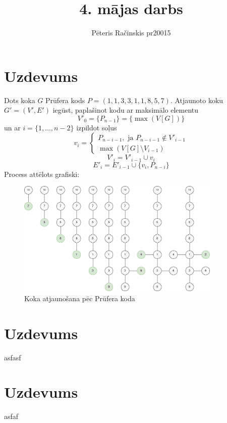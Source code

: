 \documentclass[12pt, a4paper]{article}
\author{Pēteris Račinskis pr20015}
\begin{document}
\title{4. mājas darbs}

\maketitle

\section{Uzdevums}

Dots koka $G$ Prūfera kods $P=(1,1,3,3,1,1,8,5,7)$. Atjaunoto koku $G' = (V',E')$ iegūst, paplašinot kodu ar maksimālo elementu
\begin{equation}
    V'_0 = \lbrace P_{n-1} \rbrace = \lbrace \max(V[G]) \rbrace
\end{equation}
un ar $i=\lbrace 1, ..., n-2 \rbrace$ izpildot soļus
\begin{equation}
    v_i = 
\begin{cases}
    P_{n-i-1}, \text{ ja } P_{n-i-1} \notin V'_{i-1} \\
    \max(V[G] \setminus V_{i-1})
\end{cases}
\end{equation}
\begin{equation}
    V'_i = V'_{i-1} \cup v_i
\end{equation}
\begin{equation}
    E'_i = E'_{i-1} \cup \lbrace v_i, P_{n-i} \rbrace
\end{equation}
Process attēlots grafiski:

\begin{figure}[h!]
    \centering
    \includegraphics[height=5.5cm,page=1]{pruefer.png}
    \caption{Koka atjaunošana pēc Prūfera koda}
\end{figure}

\newpage
\section{Uzdevums}

asfasf

\section{Uzdevums}

asfaf
\end{document}
